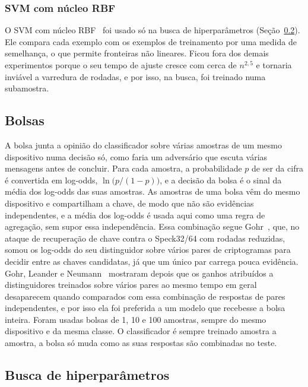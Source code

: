 \subsubsection{SVM com núcleo RBF}

O SVM com núcleo RBF~\cite{CortesVapnik1995} foi usado só na busca de hiperparâmetros (Seção~\ref{sec:met-busca}). Ele compara cada exemplo com os exemplos de treinamento por uma medida de semelhança, o que permite fronteiras não lineares. Ficou fora dos demais experimentos porque o seu tempo de ajuste cresce com cerca de $n^{2{,}5}$ e tornaria inviável a varredura de rodadas, e por isso, na busca, foi treinado numa subamostra.

\subsection{Bolsas}
\label{sec:met-bolsas}

A bolsa junta a opinião do classificador sobre várias amostras de um mesmo dispositivo numa decisão só, como faria um adversário que escuta várias mensagens antes de concluir. Para cada amostra, a probabilidade $p$ de ser da cifra é convertida em log-odds, $\ln\big(p/(1-p)\big)$, e a decisão da bolsa é o sinal da média dos log-odds das suas amostras. As amostras de uma bolsa vêm do mesmo dispositivo e compartilham a chave, de modo que não são evidências independentes, e a média dos log-odds é usada aqui como uma regra de agregação, sem supor essa independência. Essa combinação segue Gohr~\cite{gohr_2019}, que, no ataque de recuperação de chave contra o Speck32/64 com rodadas reduzidas, somou os log-odds do seu distinguidor sobre vários pares de criptogramas para decidir entre as chaves candidatas, já que um único par carrega pouca evidência. Gohr, Leander e Neumann~\cite{GohrLeanderNeumann2022} mostraram depois que os ganhos atribuídos a distinguidores treinados sobre vários pares ao mesmo tempo em geral desaparecem quando comparados com essa combinação de respostas de pares independentes, e por isso ela foi preferida a um modelo que recebesse a bolsa inteira. Foram usadas bolsas de 1, 10 e 100 amostras, sempre do mesmo dispositivo e da mesma classe. O classificador é sempre treinado amostra a amostra, a bolsa só muda como as suas respostas são combinadas no teste.

\subsection{Busca de hiperparâmetros}
\label{sec:met-busca}

